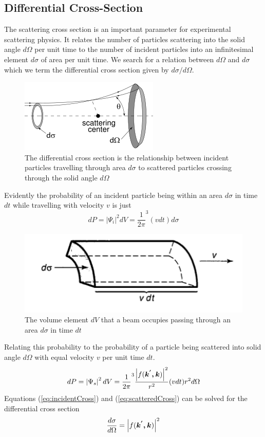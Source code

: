 \subsection{Differential Cross-Section}
The scattering cross section is an important parameter for experimental scattering physics. It relates the number of particles scattering into the solid angle $d\Omega$ per unit time to the number of incident particles into an infinitesimal element $d\sigma$ of area per unit time. We search for a relation between $d\Omega$ and $d\sigma$ which we term the differential cross section given by $d\sigma/d\Omega$.
\begin{figure}[ht!]
\centering
\includegraphics[scale=1.0]{Figures/scatteringCrossSection.png}
\caption{The differential cross section is the relationship between incident particles travelling through area $d\sigma$ to scattered particles crossing through the solid angle $d\Omega$}
\label{fig:scatteringCrossSection}
\end{figure}
Evidently the probability of an incident particle being within an area $d\sigma$ in time $dt$ while travelling with velocity $v$ is just 
\begin{equation}
dP = \left|\Psi_i\right|^2 dV  = \frac{1}{2\pi}^3 (vdt)d\sigma
\label{eq:incidentCross}
\end{equation}

\begin{figure}[ht!]
\centering
\includegraphics[scale=0.7]{Figures/incidentBeam.png}
\caption{The volume element $dV$ that a beam occupies passing through an area $d\sigma$ in time $dt$}
\label{fig:incidentBeam}
\end{figure}

Relating this probability to the probability of a particle being scattered into solid angle $d\Omega$ with equal velocity $v$ per unit time $dt$. 
\begin{equation}
\label{eq:scatteredCross}
dP=\left|\Psi_s\right|^2dV = \frac{1}{2\pi}^3 \frac{\left|f(\mbox{\boldmath$k^{'},k$})\right|^2}{r^2}(vdt)r^2 d\Omega
\end{equation}
Equations (\ref{eq:incidentCross}) and (\ref{eq:scatteredCross}) can be solved for the differential cross section 
\begin{equation}
\label{eq:differentialCrossSection}
\frac{d\sigma}{d\Omega}= \left|f(\mbox{\boldmath$k^{'},k$})\right|^2
\end{equation}

